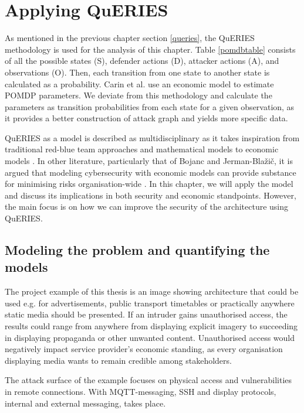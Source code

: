 \chapter{Applying QuERIES} \label{analysis}

As mentioned in the previous chapter section \ref{queries}, the
QuERIES methodology is used for the analysis of this chapter. Table
\ref{pomdbtable} consists of all the possible states (S), defender
actions (D), attacker actions (A), and observations (O). Then, each
transition from one state to another state is calculated as a
probability. Carin et al. \cite{carin2008cybersecurity} use an economic model to estimate POMDP
parameters. We deviate from this 
methodology and calculate the parameters as transition probabilities
from each state for a given observation, as it provides a better
construction of attack graph and yields more specific data.

QuERIES as a model is described as multidisciplinary as it takes
inspiration from traditional red-blue team approaches and mathematical
models to economic models \cite{hughes2013quantitative}. In other
literature, particularly that of Bojanc and Jerman-Blažič, it is argued that
modeling cybersecurity with economic models can provide substance for
minimising risks organisation-wide \cite{jerman2008economic}. In this
chapter, we will apply the model and discuss its implications in both
security and economic standpoints. However, the main focus is on how we can improve the security of the architecture using QuERIES. 

\section{Modeling the problem and quantifying the models} \label{modprob}

The project example of this thesis is an image showing architecture
that could be used e.g. for advertisements, public transport timetables
or practically anywhere static media should be presented. If an
intruder gains unauthorised access, the results could range from
anywhere from displaying explicit imagery to succeeding in displaying
propaganda or other unwanted content. Unauthorised access would negatively impact 
service provider's economic standing, as every
organisation displaying media wants to remain credible among
stakeholders.

The attack surface of the example focuses on physical access
and vulnerabilities in remote connections. With MQTT-messaging, SSH
and display protocols, internal and external messaging, takes place.

